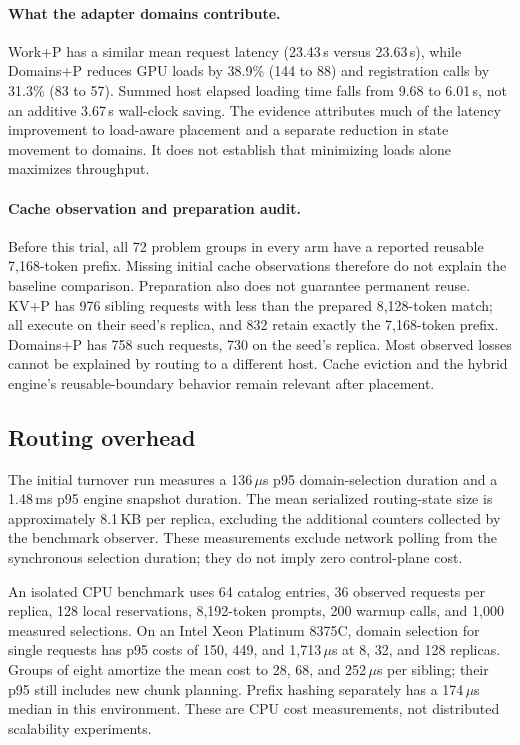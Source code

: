 \paragraph{What the adapter domains contribute.}
Work+P has a similar mean request latency (23.43\,s versus 23.63\,s), while
Domains+P reduces GPU loads by 38.9\% (144 to 88) and registration calls by
31.3\% (83 to 57). Summed host elapsed loading time falls from 9.68 to
6.01\,s, not an additive 3.67\,s wall-clock saving. The evidence attributes much
of the latency improvement to load-aware placement and a separate reduction in
state movement to domains. It does not establish that minimizing loads alone
maximizes throughput.

\paragraph{Cache observation and preparation audit.}
Before this trial, all 72 problem groups in every arm have a reported reusable
7,168-token prefix. Missing initial cache observations therefore do not explain
the baseline comparison. Preparation also does not guarantee permanent reuse.
KV+P has 976 sibling requests with less than the prepared 8,128-token match;
all execute on their seed's replica, and 832 retain exactly the 7,168-token
prefix. Domains+P has 758 such requests, 730 on the seed's replica. Most observed
losses cannot be explained by routing to a different host. Cache eviction and
the hybrid engine's reusable-boundary behavior remain relevant after placement.

\subsection{Routing overhead}
The initial turnover run measures a 136\,$\mu$s p95 domain-selection duration
and a 1.48\,ms p95 engine snapshot duration. The mean serialized routing-state
size is approximately 8.1\,KB per replica, excluding the additional counters
collected by the benchmark observer. These measurements exclude network polling
from the synchronous selection duration; they do not imply zero control-plane
cost.

An isolated CPU benchmark uses 64 catalog entries, 36 observed requests per
replica, 128 local reservations, 8,192-token prompts, 200 warmup calls, and
1,000 measured selections. On an Intel Xeon Platinum 8375C, domain selection for
single requests has p95 costs of 150, 449, and 1,713\,$\mu$s at 8, 32, and 128
replicas. Groups of eight amortize the mean cost to 28, 68, and 252\,$\mu$s per
sibling; their p95 still includes new chunk planning. Prefix hashing separately
has a 174\,$\mu$s median in this environment. These are CPU cost measurements,
not distributed scalability experiments.

